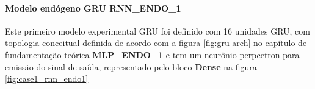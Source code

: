     \paragraph{Modelo endógeno GRU RNN\_ENDO\_1}
        Este primeiro modelo experimental GRU foi definido com 16 unidades GRU, com topologia conceitual definida de acordo com a figura \ref{fig:gru-arch} no capítulo de fundamentação teórica \textbf{MLP\_ENDO\_1} e tem um neurônio perpcetron para emissão do sinal de saída, representado pelo bloco \textbf{Dense} na figura \ref{fig:case1_rnn_endo1}
        \begin{figure}[h]
        \end{figure}
        
